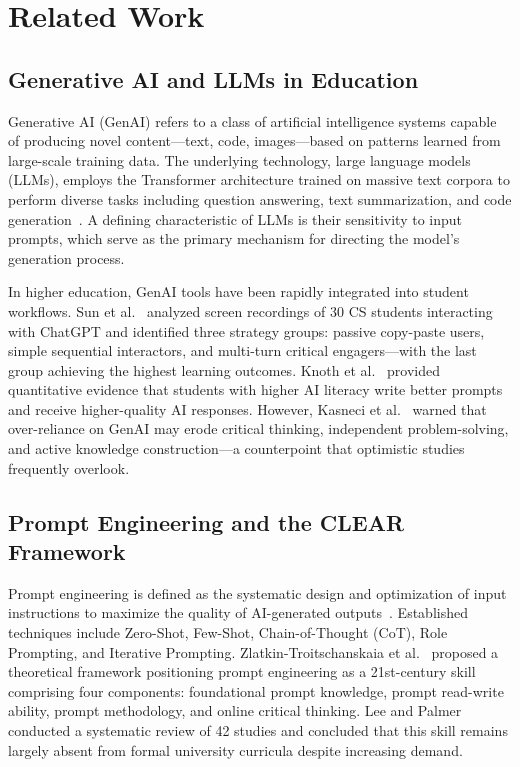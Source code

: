 \documentclass[runningheads]{llncs}
\begin{document}
\section{Related Work}\label{sec:related}

\subsection{Generative AI and LLMs in Education}

Generative AI (GenAI) refers to a class of artificial intelligence systems capable of producing novel content---text, code, images---based on patterns learned from large-scale training data. The underlying technology, large language models (LLMs), employs the Transformer architecture trained on massive text corpora to perform diverse tasks including question answering, text summarization, and code generation~\cite{Brown2020,Bommasani2021}. A defining characteristic of LLMs is their sensitivity to input prompts, which serve as the primary mechanism for directing the model's generation process.

In higher education, GenAI tools have been rapidly integrated into student workflows. Sun et al.~\cite{Sun2024} analyzed screen recordings of 30 CS students interacting with ChatGPT and identified three strategy groups: passive copy-paste users, simple sequential interactors, and multi-turn critical engagers---with the last group achieving the highest learning outcomes. Knoth et al.~\cite{Knoth2024} provided quantitative evidence that students with higher AI literacy write better prompts and receive higher-quality AI responses. However, Kasneci et al.~\cite{Kasneci2023} warned that over-reliance on GenAI may erode critical thinking, independent problem-solving, and active knowledge construction---a counterpoint that optimistic studies frequently overlook.

\subsection{Prompt Engineering and the CLEAR Framework}

Prompt engineering is defined as the systematic design and optimization of input instructions to maximize the quality of AI-generated outputs~\cite{Sahoo2024}. Established techniques include Zero-Shot, Few-Shot, Chain-of-Thought (CoT), Role Prompting, and Iterative Prompting. Zlatkin-Troitschanskaia et al.~\cite{Zlatkin2024} proposed a theoretical framework positioning prompt engineering as a 21st-century skill comprising four components: foundational prompt knowledge, prompt read-write ability, prompt methodology, and online critical thinking. Lee and Palmer~\cite{Lee2025} conducted a systematic review of 42 studies and concluded that this skill remains largely absent from formal university curricula despite increasing demand.
\end{document}
